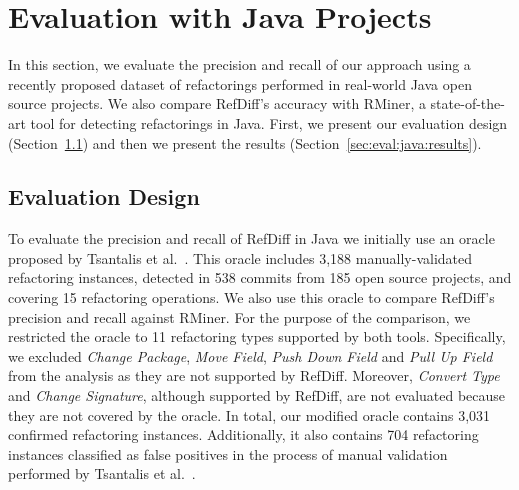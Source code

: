 \section{Evaluation with Java Projects}
\label{sec:eval:java}

In this section, we evaluate the precision and recall of our approach using a recently proposed dataset of refactorings performed in real-world Java open source projects. We also compare RefDiff's accuracy with RMiner, 
a state-of-the-art tool for detecting refactorings in Java.
First, we present our evaluation design (Section~\ref{sec:eval:java:design}) and then we present the results (Section~\ref{sec:eval:java:results}).

\subsection{Evaluation Design}
\label{sec:eval:java:design}

To evaluate the precision and recall of RefDiff in Java we initially use an oracle proposed by Tsantalis et al.~\cite{tsantalis2018rminer}.
This oracle includes 3,188 manually-validated refactoring instances, detected in 538 commits from 185 open source projects, and covering 15 refactoring operations.
We also use this oracle to compare RefDiff's precision and recall against RMiner.
For the purpose of the comparison, we restricted the oracle to 11 refactoring types supported by both tools.
Specifically, we excluded \emph{Change Package}, \emph{Move Field}, \emph{Push Down Field} and \emph{Pull Up Field} from the analysis as they are not supported by RefDiff.
Moreover, \emph{Convert Type} and \emph{Change Signature}, although supported by RefDiff, are not evaluated because they are not covered by the oracle.
In total, our modified oracle contains 3,031 confirmed refactoring instances.
Additionally, it also contains 704 refactoring instances classified as false positives in the process of manual validation performed by Tsantalis et al.~\cite{tsantalis2018rminer}.


